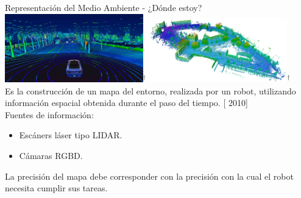 \documentclass[
  24pt, %
  aspectratio=169, %
]{beamer}
\begin{document}
\begin{frame}{Representación del Medio Ambiente - ¿Dónde estoy?}
  \bigskip %
  \centering
  \includegraphics[width=0.45\textwidth,height=0.35\textheight]{map3d.jpg}$^\dag$
  \hfil
  \includegraphics[width=0.45\textwidth,height=0.35\textheight]{map3d_2}$^\dag$
  \vspace{2pt}\\
  \bigskip %
  Es la construcción de un mapa del entorno, realizada por un robot, utilizando información espacial obtenida durante el paso del tiempo. [\citeauthor{Wallgrn2010} 2010]\\
  \bigskip %
  Fuentes de información:
  \begin{itemize}
  \item Escáners láser tipo LIDAR.
  \item Cámaras RGBD.
  \end{itemize}  

  \bigskip %
  
  \tiny La precisión del mapa debe corresponder con la precisión con la cual el robot necesita cumplir sus tareas.
  
\end{frame}
\end{document}
